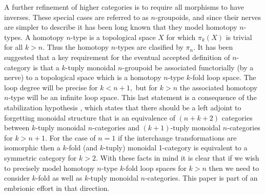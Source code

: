 \documentclass{tac}
\begin{document}
{            A further refinement of higher categories is to require all morphisms to have inverses. These special cases
            are referred to as $n$-groupoids, and since their nerves are simpler to describe it has been long known
            that they model homotopy $n$-types. A homotopy $n$-type is a topological space 
            $X$ for which $\pi_k(X)$ is trivial
            for all $k>n.$ Thus the homotopy $n$-types are clasified by $\pi_n.$ It has been suggested that
            a key requirement for the eventual accepted definition of $n$-category is that a $k$-tuply monoidal
            $n$-groupoid be associated functorially (by a nerve) to a topological space which is a  
            homotopy $n$-type $k$-fold loop space. \cite{Baez1} The loop degree will be precise for $k<n+1,$ but for $k>n$ the 
            associated homotopy $n$-type will be an infinite loop space. This last statement is a consequence of 
            the stabilization hypothesis , which states that there should be a left adjoint to 
            forgetting monoidal structure
            that is an equivalence of $(n+k+2)$ categories between $k$-tuply monoidal $n$-categories and $(k+1)$-tuply
            monoidal $n$-categories for $k>n+1.$ For the case of $n=1$ if the 
            interchange transformations are isomorphic then a $k$-fold (and $k$-tuply) monoidal 1-category
            is equivalent to
            a symmetric category for $k>2.$
            With these facts in mind it is clear that if we wish to precisely model homotopy $n$-type $k$-fold loop spaces
            for $k>n$ then we need to consider $k$-fold as well as $k$-tuply monoidal $n$-categories.
            This paper is part of an embrionic effort in that direction. 
            
}
\end{document}
